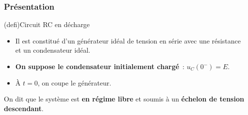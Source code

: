 \documentclass[../../main/main.tex]{subfiles}
\begin{document}
\subsubsection{Présentation}
\begin{tcb*}[sidebyside, righthand ratio=.30](defi){Circuit RC en décharge}
	\begin{itemize}
		\item Il est constitué d'un générateur idéal de tension en série avec une
		      résistance et un condensateur idéal.
		\item \textbf{On suppose le condensateur initialement chargé}~: $u_C(0^-) =
			      E$.
		\item À $t=0$, on coupe le générateur.
	\end{itemize}
	On dit que le système est \textbf{en régime libre} et soumis à un
	\textbf{échelon de tension descendant}.
	\tcblower
	\begin{center}
\end{center}
\end{tcb*}
\end{document}
